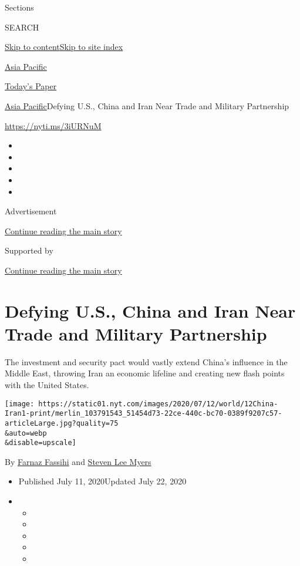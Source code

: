 Sections

SEARCH

\protect\hyperlink{site-content}{Skip to
content}\protect\hyperlink{site-index}{Skip to site index}

\href{https://www.nytimes.com/section/world/asia}{Asia Pacific}

\href{https://myaccount.nytimes.com/auth/login?response_type=cookie\&client_id=vi}{}

\href{https://www.nytimes.com/section/todayspaper}{Today's Paper}

\href{/section/world/asia}{Asia Pacific}\textbar{}Defying U.S., China
and Iran Near Trade and Military Partnership

\url{https://nyti.ms/3iURNuM}

\begin{itemize}
\item
\item
\item
\item
\item
\end{itemize}

Advertisement

\protect\hyperlink{after-top}{Continue reading the main story}

Supported by

\protect\hyperlink{after-sponsor}{Continue reading the main story}

\hypertarget{defying-us-china-and-iran-near-trade-and-military-partnership}{%
\section{Defying U.S., China and Iran Near Trade and Military
Partnership}\label{defying-us-china-and-iran-near-trade-and-military-partnership}}

The investment and security pact would vastly extend China's influence
in the Middle East, throwing Iran an economic lifeline and creating new
flash points with the United States.

\texttt{[image: https://static01.nyt.com/images/2020/07/12/world/12China-Iran1-print/merlin\_103791543\_51454d73-22ce-440c-bc70-0389f9207c57-articleLarge.jpg?quality=75\\\&auto=webp\\\&disable=upscale]}

By \href{https://www.nytimes.com/by/farnaz-fassihi}{Farnaz Fassihi} and
\href{https://www.nytimes.com/by/steven-lee-myers}{Steven Lee Myers}

\begin{itemize}
\item
  Published July 11, 2020Updated July 22, 2020
\item
  \begin{itemize}
  \item
  \item
  \item
  \item
  \item
  \end{itemize}
\end{itemize}

